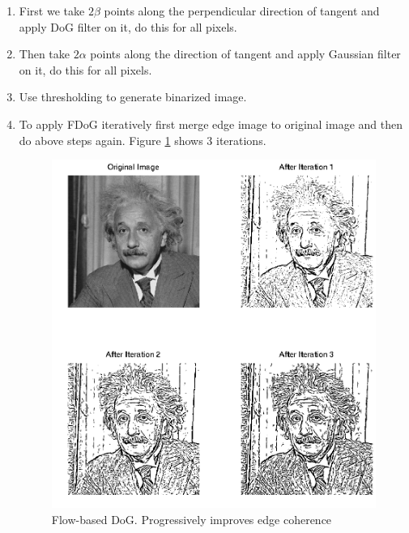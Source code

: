 \documentclass[a4paper]{article}
\begin{document}
\begin{enumerate}
\item First we take $2\beta$ points along the perpendicular direction of tangent and apply DoG filter on it, do this for all pixels.
\item Then take $2\alpha$ points along the direction of tangent and apply Gaussian filter on it, do this for all pixels.
\item Use thresholding to generate binarized image.
\item To apply FDoG iteratively first merge edge image to original image and then do above steps again. Figure \ref{fig:fdog} shows 3 iterations.
\begin{figure}
\centering
\includegraphics[width=1\textwidth]{fdog.png}
\caption{\label{fig:fdog}Flow-based DoG. Progressively improves edge coherence}
\end{figure}
\end{enumerate}
\end{document}
